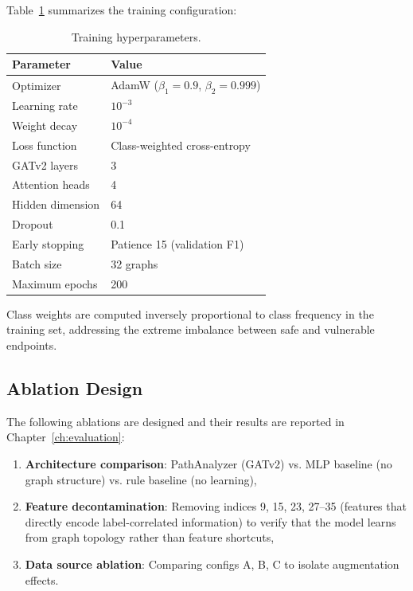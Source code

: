 Table~\ref{tab:hyperparams} summarizes the training configuration:

\begin{table}[htbp]
\centering
\caption{Training hyperparameters.}
\label{tab:hyperparams}
\small
\begin{tabular}{@{}ll@{}}
\toprule
\textbf{Parameter} & \textbf{Value} \\
\midrule
Optimizer & AdamW ($\beta_1=0.9$, $\beta_2=0.999$) \\
Learning rate & $10^{-3}$ \\
Weight decay & $10^{-4}$ \\
Loss function & Class-weighted cross-entropy \\
GATv2 layers & 3 \\
Attention heads & 4 \\
Hidden dimension & 64 \\
Dropout & 0.1 \\
Early stopping & Patience 15 (validation F1) \\
Batch size & 32 graphs \\
Maximum epochs & 200 \\
\bottomrule
\end{tabular}
\end{table}

Class weights are computed inversely proportional to class frequency in the training set, addressing the extreme imbalance between safe and vulnerable endpoints.

\subsection{Ablation Design}

The following ablations are designed and their results are reported in Chapter~\ref{ch:evaluation}:

\begin{enumerate}
    \item \textbf{Architecture comparison}: PathAnalyzer (GATv2) vs. MLP baseline (no graph structure) vs. rule baseline (no learning),
    \item \textbf{Feature decontamination}: Removing indices 9, 15, 23, 27--35 (features that directly encode label-correlated information) to verify that the model learns from graph topology rather than feature shortcuts,
    \item \textbf{Data source ablation}: Comparing configs A, B, C to isolate augmentation effects.
\end{enumerate}

